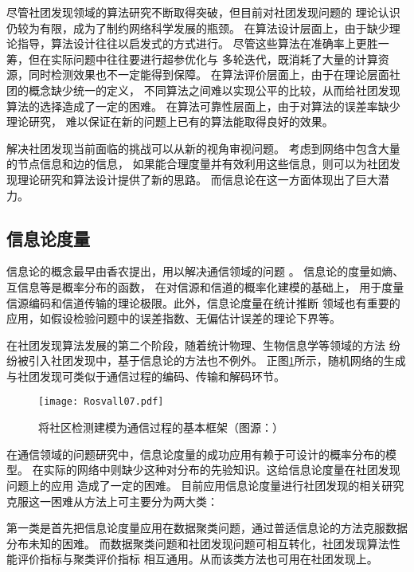 
尽管社团发现领域的算法研究不断取得突破，但目前对社团发现问题的
理论认识仍较为有限，成为了制约网络科学发展的瓶颈。
在算法设计层面上，由于缺少理论指导，算法设计往往以启发式的方式进行。
尽管这些算法在准确率上更胜一筹，但在实际问题中往往要进行超参优化与
多轮迭代，既消耗了大量的计算资源，同时检测效果也不一定能得到保障。
在算法评价层面上，由于在理论层面社团的概念缺少统一的定义，
不同算法之间难以实现公平的比较，从而给社团发现算法的选择造成了一定的困难。
在算法可靠性层面上，由于对算法的误差率缺少理论研究，
难以保证在新的问题上已有的算法能取得良好的效果。

解决社团发现当前面临的挑战可以从新的视角审视问题。
考虑到网络中包含大量的节点信息和边的信息，
如果能合理度量并有效利用这些信息，则可以为社团发现理论研究和算法设计提供了新的思路。
而信息论在这一方面体现出了巨大潜力。

\subsection{信息论度量}
信息论的概念最早由香农提出，用以解决通信领域的问题 \cite{shannon1948mathematical}。
信息论的度量如熵、互信息等是概率分布的函数，
在对信源和信道的概率化建模的基础上，
用于度量信源编码和信道传输的理论极限。此外，信息论度量在统计推断
领域也有重要的应用，如假设检验问题中的误差指数、无偏估计误差的理论下界等。

在社团发现算法发展的第二个阶段，随着统计物理、生物信息学等领域的方法
纷纷被引入社团发现中，基于信息论的方法也不例外。
正图\ref{fig:communication_community}所示，随机网络的生成与社团发现可类似于通信过程的编码、传输和解码环节。


\begin{figure}[!ht]
    \texttt{[image: Rosvall07.pdf]}
    \caption{将社区检测建模为通信过程的基本框架（图源：）}
    \label{fig:communication_community}
\end{figure}

在通信领域的问题研究中，信息论度量的成功应用有赖于可设计的概率分布的模型。
在实际的网络中则缺少这种对分布的先验知识。这给信息论度量在社团发现问题上的应用
造成了一定的困难。
目前应用信息论度量进行社团发现的相关研究克服这一困难从方法上可主要分为两大类：

第一类是首先把信息论度量应用在数据聚类问题，通过普适信息论的方法克服数据分布未知的困难\cite{raman20219}。
而数据聚类问题和社团发现问题可相互转化，社团发现算法性能评价指标与聚类评价指标
相互通用。从而该类方法也可用在社团发现上。

